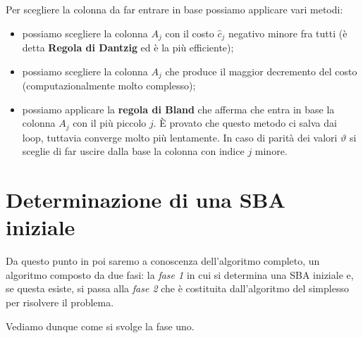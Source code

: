 \documentclass[11pt]{book}
\begin{document}
Per scegliere la colonna da far entrare in base possiamo applicare
vari metodi:

\begin{itemize}
  
\item possiamo scegliere la colonna $A_j$ con il costo $\hat{c}_j$
  negativo minore fra tutti (\`e detta {\bf Regola di Dantzig} ed \`e
  la pi\`u efficiente);

\item possiamo scegliere la colonna $A_j$ che produce il maggior
  decremento del costo (computazionalmente molto complesso);

\item possiamo applicare la {\bf regola di Bland} che afferma che
  entra in base la colonna $A_j$ con il pi\`u piccolo $j$. \`E provato
  che questo metodo ci salva dai loop, tuttavia converge molto pi\`u
  lentamente. In caso di parit\`a dei valori $\vartheta$ si sceglie di
  far uscire dalla base la colonna con indice $j$ minore.

\end{itemize}


\section{Determinazione di una SBA iniziale}

Da questo punto in poi saremo a conoscenza dell'algoritmo completo, un
algoritmo composto da due fasi: la {\em fase 1} in cui si determina
una SBA iniziale e, se questa esiste, si passa alla {\em fase 2} che
\`e costituita dall'algoritmo del simplesso per risolvere il problema.

Vediamo dunque come si svolge la fase uno.
\end{document}
